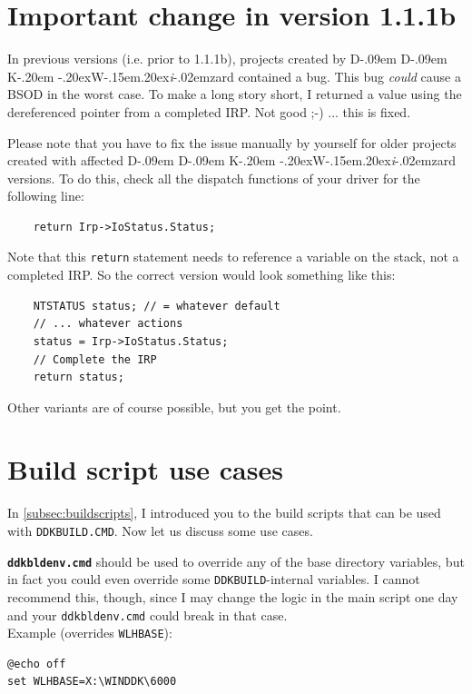 \documentclass[a4paper,titlepage]{report}
\def\ddkwiz{D\kern-.09em D\kern-.09em K\kern-.20em \raise-.20ex\hbox{W}\kern-.15em\raise.20ex\hbox{\it{i}}\kern-.02em{zard}}
\begin{document}
\section{Important change in version 1.1.1b}
In previous versions (i.e. prior to 1.1.1b), projects created by \ddkwiz{} contained
a bug. This bug \emph{could} cause a BSOD in the worst case. To make a long story short,
I returned a value using the dereferenced pointer from a completed IRP. Not good \textsf{;-)}
... this is fixed.

Please note that you have to fix the issue manually by yourself for older projects created
with affected \ddkwiz{} versions. To do this, check all the dispatch functions of your driver
for the following line:

\begin{verbatim}
    return Irp->IoStatus.Status;
\end{verbatim}

Note that this \texttt{return} statement needs to reference a variable on the stack, not a completed
IRP. So the correct version would look something like this:

\begin{verbatim}
    NTSTATUS status; // = whatever default
    // ... whatever actions
    status = Irp->IoStatus.Status;
    // Complete the IRP
    return status;
\end{verbatim}

Other variants are of course possible, but you get the point.

\section{Build script use cases}
In \autoref{subsec:buildscripts}, I introduced you to the build scripts that can be used with
\texttt{DDKBUILD.CMD}. Now let us discuss some use cases.

\textbf{\texttt{ddkbldenv.cmd}} should be used to override any of the base directory variables, but
in fact you could even override some \texttt{DDKBUILD}-internal variables. I cannot recommend
this, though, since I may change the logic in the main script one day and your \texttt{ddkbldenv.cmd}
could break in that case.\\

Example (overrides \texttt{WLHBASE}):

\begin{verbatim}
@echo off
set WLHBASE=X:\WINDDK\6000
\end{verbatim}
\end{document}
